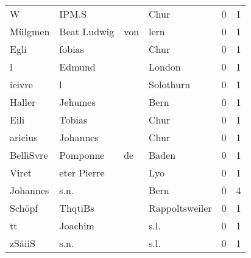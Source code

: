 \begin{tabular}{llllrr}
                        W &                              IPM.S &             &                                        Chur &          0 &         1 \\
                  Mülgmen &                        Beat Ludwig &         von &                                        lern &          0 &         1 \\
                     Egli &                             fobias &             &                                        Chur &          0 &         1 \\
                        l &                             Edmund &             &                                      London &          0 &         1 \\
                   ieivre &                                  l &             &                                   Solothurn &          0 &         1 \\
                   Haller &                            Jehumes &             &                                        Bern &          0 &         1 \\
                     Eili &                             Tobias &             &                                        Chur &          0 &         1 \\
                  aricius &                           Johannes &             &                                        Chur &          0 &         1 \\
                BelliSvre &                           Pomponne &          de &                                       Baden &          0 &         1 \\
                    Viret &                        eter Pierre &             &                                         Lyo &          0 &         1 \\
                 Johannes &                               s.n. &             &                                        Bern &          0 &         4 \\
                   Schöpf &                            ThqtiBs &             &                              Rappoltsweiler &          0 &         1 \\
                       tt &                            Joachim &             &                                        s.l. &          0 &         1 \\
                   zSäiiS &                               s.n. &             &                                        s.l. &          0 &         1 \\

\end{tabular}
